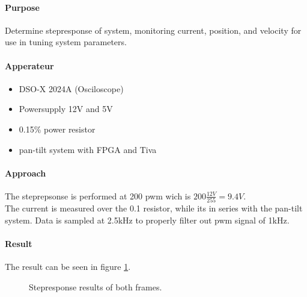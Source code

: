 \documentclass[../../main]{subfiles}
\begin{document}
\paragraph{Purpose}%
\label{par:purpose}

Determine stepresponse of system, monitoring current, position, and velocity for use in tuning system parameters.

\paragraph{Apperateur}%
\label{par:apperateur}
\begin{itemize}
	\item DSO-X 2024A (Osciloscope)
	\item Powersupply 12\si{V} and 5\si{V}
	\item 0.1\si{\Omega}5\% power resistor
	\item pan-tilt system with FPGA and Tiva
\end{itemize}


\paragraph{Approach}%
\label{par:approach}
The steprepsonse is performed at 200 pwm wich is $200\frac{12\si{V}}{255} = 9.4\si{V}$.\\
The current is measured over the 0.1\si{\Omega} resistor, while its in series with the pan-tilt system.
Data is sampled at 2.5\si{kHz} to properly filter out pwm signal of 1\si{kHz}.

\paragraph{Result}%
\label{par:result}

The result can be seen in figure \ref{fig:jour_step_bot}.


\begin{figure}[H]
        \centering
				\def\svgwidth{0.47\columnwidth}
				\def\svgwidth{0.47\columnwidth}
				\caption{Stepresponse results of both frames.}
				\label{fig:jour_step_bot}
\end{figure}
\end{document}
